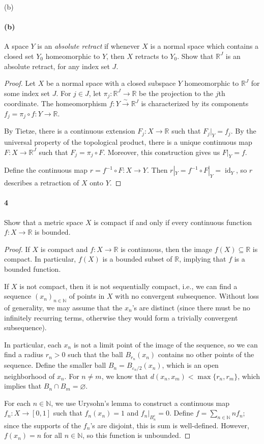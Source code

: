 \documentclass[12pt]{article}
\newlength{\myparskip}
\newenvironment{fullbox}{\begin{lrbox}{\savefullbox}\begin{minipage}{\dimexpr\textwidth-2\fboxsep\relax}\setlength{\parskip}{\myparskip}}{\end{minipage}\end{lrbox}\framebox[\textwidth]{\usebox{\savefullbox}}}
\newenvironment{pbox}[1][]{\begin{fullbox}\ifx#1\empty\else\paragraph{#1}\fi}{\end{fullbox}}
\theoremstyle{definition}
\newcommand{\N}{\mathbb{N}}
\newcommand{\R}{\mathbb{R}}
\newcommand{\eps}{\varepsilon}
\renewcommand{\emptyset}{\varnothing}
\newcommand{\<}{\langle}
\renewcommand{\>}{\rangle}
\DeclareMathOperator{\id}{id}
\begin{document}
\begin{pbox}[(b)]
    A space $Y$ is an \emph{absolute retract} if whenever $X$ is a normal
    space which contains a closed set $Y_0$ homeomorphic to $Y$, then $X$
    retracts to $Y_0$.  Show that $\mathbb R^J$ is an absolute retract, for any
    index set $J$.
\end{pbox}

\begin{proof}
    Let $X$ be a normal space with a closed subspace $Y$ homeomorphic to $\R^J$ for some index set $J$.
    For $j \in J$, let $\pi_j : \R^J \to \R$ be the projection to the $j$th coordinate.
    The homeomorphism $f : Y \xrightarrow{\sim} \R^J$ is characterized by its components $f_j = \pi_j \circ f : Y \to \R$.
    
    By Tietze, there is a continuous extension $F_j : X \to \R$ such that $F_j|_Y = f_j$.
    By the universal property of the topological product, there is a unique continuous map $F : X \to \R^J$ such that $F_j = \pi_j \circ F$.
    Moreover, this construction gives us $F|_Y = f$.

    Define the continuous map $r = f^{-1} \circ F : X \to Y$. 
    Then $r|_Y = f^{-1} \circ F|_Y = \id_Y$, so $r$ describes a retraction of $X$ onto $Y$.
\end{proof}



\newpage
\begin{pbox}[4]
    Show that a metric space $X$ is compact if and only if every continuous function $f:X \to \mathbb R$ is bounded.
\end{pbox}

\begin{proof}
    If $X$ is compact and $f : X \to \R$ is continuous, then the image $f(X) \subseteq \R$ is compact. In particular, $f(X)$ is a bounded subset of $\R$, implying that $f$ is a bounded function.

    If $X$ is not compact, then it is not sequentially compact, i.e., we can find a sequence $(x_n)_{n \in \N}$ of points in $X$ with no convergent subsequence.
    Without loss of generality, we may assume that the $x_n$'s are distinct (since there must be no infinitely recurring terms, otherwise they would form a trivially convergent subsequence).

    In particular, each $x_n$ is not a limit point of the image of the sequence, so we can find a radius $r_n > 0$ such that the ball $B_{r_n}(x_n)$ contains no other points of the sequence.
    Define the smaller ball $B_n = B_{\eps_n/2}(x_n)$, which is an open neighborhood of $x_n$. For $n \ne m$, we know that $d(x_n, x_m) < \max\{r_n, r_m\}$, which implies that $B_n \cap B_m = \emptyset$.

    For each $n \in \N$, we use Urysohn's lemma to construct a continuous map $f_n : X \to [0, 1]$ such that $f_n(x_n) = 1$ and $f_n|_{B_n^c} = 0$. Define $f = \sum_{n\in\N} nf_n$; since the supports of the $f_n$'s are disjoint, this is sum is well-defined. However, $f(x_n) = n$ for all $n \in \N$, so this function is unbounded.
\end{proof}
\end{document}
